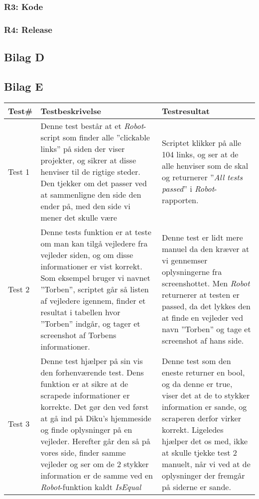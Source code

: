 \documentclass[12pt]{article}
\begin{document}
\subsubsection{R3: Kode}
\subsubsection{R4: Release}
\subsection{Bilag D}

\newpage
\subsection{Bilag E}
\begin{center}
	\begin{tabular}{|p{}|p{}|p{}|}
		\hline
	\textbf{Test\#} & \textbf{Testbeskrivelse} & \textbf{Testresultat} \\ \hline

	Test 1 & Denne test består at et \textit{Robot}-script som finder alle ''clickable links'' på siden der viser projekter, og sikrer at disse henviser til de rigtige steder. Den tjekker om det passer ved at sammenligne den side den ender på, med den side vi mener det skulle være & Scriptet klikker på alle 104 links, og ser at de alle henviser som de skal og returnerer ''\textit{All tests passed}'' i \textit{Robot}-rapporten.  \\ \hline

	Test 2 & Denne tests funktion er at teste om man kan tilgå vejledere fra vejleder siden, og om disse informationer er vist korrekt. Som eksempel bruger vi navnet ''Torben'', scriptet går så listen af vejledere igennem, finder et resultat i tabellen hvor ''Torben'' indgår, og tager et screenshot af Torbens informationer. & Denne test er lidt mere manuel da den kræver at vi gennemser oplysningerne fra screenshottet. Men \textit{Robot} returnerer at testen er passed, da det lykkes den at finde en vejleder ved navn ''Torben'' og tage et screenshot af hans side.\\ \hline

	Test 3 & Denne test hjælper på sin vis den forhenværende test. Dens funktion er at sikre at de scrapede informationer er korrekte. Det gør den ved først at gå ind på Diku's hjemmeside og finde oplysninger på en vejleder. Herefter går den så på vores side, finder samme vejleder og ser om de 2 stykker information er de samme ved en \textit{Robot}-funktion kaldt \textit{IsEqual} & Denne test som den eneste returner en bool, og da denne er true, viser det at de to stykker information er sande, og scraperen derfor virker korrekt. \newline
	Ligeledes hjælper det os med, ikke at skulle tjekke test 2 manuelt, når vi ved at de oplysninger der fremgår på siderne er sande. \\ \hline
	\end{tabular}
\end{center}
\end{document}

